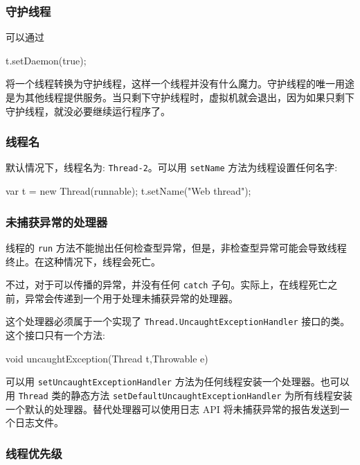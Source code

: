 \subsubsection{守护线程}

可以通过

\begin{Java}
t.setDaemon(true);
\end{Java}

将一个线程转换为守护线程，这样一个线程并没有什么魔力。守护线程的唯一用途是为其他线程提供服务。当只剩下守护线程时，虚拟机就会退出，因为如果只剩下守护线程，就没必要继续运行程序了。

\subsubsection{线程名}

默认情况下，线程名为: \texttt{Thread-2}。可以用 \texttt{setName} 方法为线程设置任何名字:

\begin{Java}
var t = new Thread(runnable);
t.setName("Web thread");
\end{Java}

\subsubsection{未捕获异常的处理器}

线程的 \texttt{run} 方法不能抛出任何检查型异常，但是，非检查型异常可能会导致线程终止。在这种情况下，线程会死亡。

不过，对于可以传播的异常，并没有任何 \texttt{catch} 子句。实际上，在线程死亡之前，异常会传递到一个用于处理未捕获异常的处理器。

这个处理器必须属于一个实现了 \texttt{Thread.UncaughtExceptionHandler} 接口的类。这个接口只有一个方法:

\begin{Java}
void uncaughtException(Thread t,Throwable e)
\end{Java}

可以用 \texttt{setUncaughtExceptionHandler} 方法为任何线程安装一个处理器。也可以用 \texttt{Thread} 类的静态方法 \texttt{setDefaultUncaughtExceptionHandler} 为所有线程安装一个默认的处理器。替代处理器可以使用日志 API 将未捕获异常的报告发送到一个日志文件。

\subsubsection{线程优先级}


